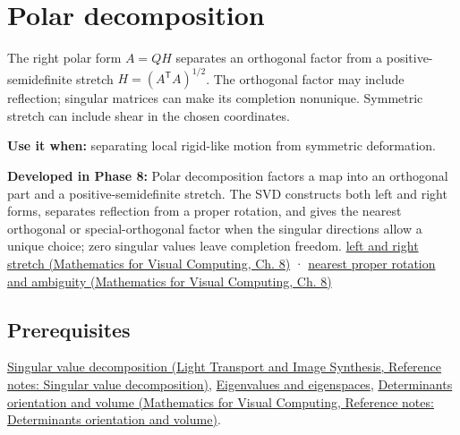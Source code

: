 \hypertarget{appendix-73f5bcf7a462}{}\label{referencestart:appendix-73f5bcf7a462}
\section{Polar decomposition}\label{appendix-73f5bcf7a462-polar-decomposition}

\hypertarget{appendix-73f5bcf7a462-polar-decomposition}{}

The right polar form \(A=QH\) separates an orthogonal factor from a positive-semidefinite stretch \(H=(A^\mathsf T A)^{1/2}\). The orthogonal factor may include reflection; singular matrices can make its completion nonunique. Symmetric stretch can include shear in the chosen coordinates.

\textbf{Use it when:} separating local rigid-like motion from symmetric deformation.

\textbf{Developed in Phase 8:} Polar decomposition factors a map into an orthogonal part and a positive-semidefinite stretch. The SVD constructs both left and right forms, separates reflection from a proper rotation, and gives the nearest orthogonal or special-orthogonal factor when the singular directions allow a unique choice; zero singular values leave completion freedom. \href{../02-Mathematics-for-Visual-Computing/main.pdf\#nameddest=02-foundations-ii-ch024-polar-decomposition-separates-frame-dependent-stretch-from-orientation}{left and right stretch (Mathematics for Visual Computing, Ch. 8)} · \href{../02-Mathematics-for-Visual-Computing/main.pdf\#nameddest=02-foundations-ii-ch024-two-sided-rotations-nearest-proper-rotation-and-nonunique-directions}{nearest proper rotation and ambiguity (Mathematics for Visual Computing, Ch. 8)}

\subsection{Prerequisites}\label{appendix-73f5bcf7a462-prerequisites}

\hypertarget{appendix-73f5bcf7a462-prerequisites}{}

\href{../04-Light-Transport-and-Image-Synthesis/main.pdf\#nameddest=appendix-1fad5e7f36fa}{Singular value decomposition (Light Transport and Image Synthesis, Reference notes: Singular value decomposition)}, \hyperref[appendix-0b3be18411f9]{Eigenvalues and eigenspaces}, \href{../02-Mathematics-for-Visual-Computing/main.pdf\#nameddest=appendix-da478be01d02}{Determinants orientation and volume (Mathematics for Visual Computing, Reference notes: Determinants orientation and volume)}.

